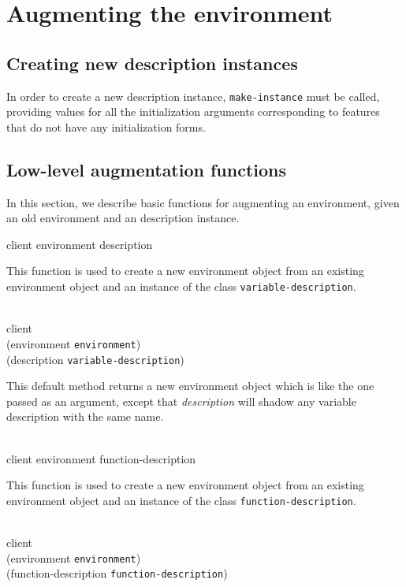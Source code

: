 \chapter{Augmenting the environment}

\section{Creating new description instances}

In order to create a new description instance, \texttt{make-instance}
must be called, providing values for all the initialization arguments
corresponding to features that do not have any initialization forms.

\section{Low-level augmentation functions}

In this section, we describe basic functions for augmenting an
environment, given an old environment and an description instance.

{\footnotesize
{} {client environment description}
}

This function is used to create a new environment object from an
existing environment object and an instance of the class
\texttt{variable-description}.

\\
           {client\\
            (environment {\tt environment})\\
            (description {\tt variable-description})}

This default method returns a new environment object which is like the
one passed as an argument, except that \textit{description}
will shadow any variable description with the same name.

\\
            {client environment function-description}

This function is used to create a new environment object from an
existing environment object and an instance of the class
\texttt{function-description}.

\\
           {client\\
            (environment {\tt environment})\\
            (function-description {\tt function-description})}

